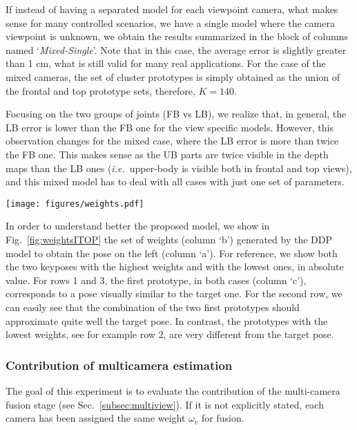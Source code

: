 \documentclass[review,12pt,3p]{elsarticle}
\def \ie{\textit{i.e.}}
\begin{document}
If instead of having a separated model for each viewpoint camera, what makes sense for many controlled scenarios, we have a single model where the camera viewpoint is unknown, we obtain the results summarized in the block of columns named `\textit{Mixed-Single}'. Note that in this case, the average error is slightly greater than 1 cm, what is still valid for many real applications. For the case of the mixed cameras, the set of cluster prototypes is simply obtained as the union of the frontal and top prototype sets, therefore, $K=140$.

Focusing on the two groups of joints (FB vs LB), we realize that, in general, the LB error is lower than the FB one for the view specific models. However, this observation changes for the mixed case, where the LB error is more than twice the FB one. This makes sense as the UB parts are twice visible in the depth maps than the LB ones (\ie~upper-body is visible both in frontal and top views), and this mixed model has to deal with all cases with just one set of parameters.

\begin{figure*}[tbhp]
\centering
   \texttt{[image: figures/weights.pdf]}
   \caption{\textbf{Weights and prototype poses from ITOP}.
   \textbf{(a)} Target pose. \textbf{(b)} Weight estimated for each prototype pose ($K=70$). \textbf{(c)} to \textbf{(f)} Prototype poses sorted by decreasing absolute value of its weight.
   If the weight is positive, the trunk segments and the joints are drawn in green, otherwise, they are drawn in black. Best viewed in color.
   }
   \label{fig:weightsITOP}
\end{figure*}

In order to understand better the proposed model, we show in Fig.~\ref{fig:weightsITOP} the set of weights (column `b') generated by the DDP model to obtain the pose on the left (column `a'). For reference, we show both the two keyposes with the highest weights and with the lowest ones, in absolute value. For rows 1 and 3, the first prototype, in both cases (column `c'), corresponds to a pose visually similar to the target one. For the second row, we can easily see that the combination of the two first prototypes should approximate quite well the target pose. In contrast, the prototypes with the lowest weights, see for example row 2, are very different from the target pose.

\subsubsection{Contribution of multicamera estimation}
The goal of this experiment is to evaluate the contribution of the multi-camera fusion stage (see Sec.~\ref{subsec:multiview}). If it is not explicitly stated, each camera has been assigned the same weight $\omega_v$ for fusion.
\end{document}
